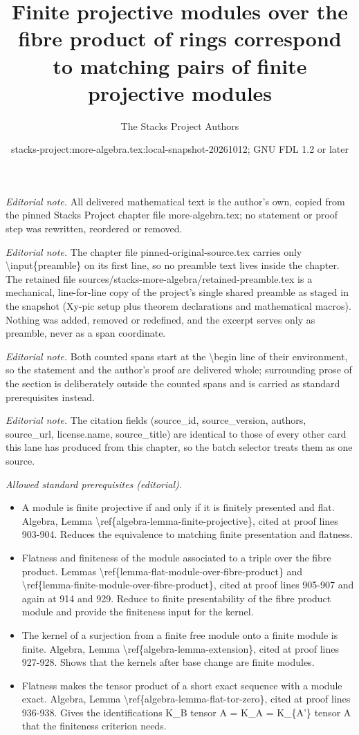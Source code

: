\documentclass[10pt,a4paper]{amsart}
\title{Finite projective modules over the fibre product of rings correspond to matching pairs of finite projective modules}
\author{The Stacks Project Authors}
\date{stacks-project:more-algebra.tex:local-snapshot-20261012; GNU FDL 1.2 or later}
\theoremstyle{plain}
\theoremstyle{definition}
\theoremstyle{remark}
\numberwithin{equation}{subsection}
\begin{document}
\maketitle
\setcounter{subsection}{1}
\noindent\textit{Editorial note.} All delivered mathematical text is the author's own, copied from the pinned Stacks Project chapter file more-algebra.tex; no statement or proof step was rewritten, reordered or removed.\par\medskip
\noindent\textit{Editorial note.} The chapter file pinned-original-source.tex carries only \textbackslash{}input\{preamble\} on its first line, so no preamble text lives inside the chapter. The retained file sources/stacks-more-algebra/retained-preamble.tex is a mechanical, line-for-line copy of the project's single shared preamble as staged in the snapshot (Xy-pic setup plus theorem declarations and mathematical macros). Nothing was added, removed or redefined, and the excerpt serves only as preamble, never as a span coordinate.\par\medskip
\noindent\textit{Editorial note.} Both counted spans start at the \textbackslash{}begin line of their environment, so the statement and the author's proof are delivered whole; surrounding prose of the section is deliberately outside the counted spans and is carried as standard prerequisites instead.\par\medskip
\noindent\textit{Editorial note.} The citation fields (source\_id, source\_version, authors, source\_url, license.name, source\_title) are identical to those of every other card this lane has produced from this chapter, so the batch selector treats them as one source.\par\medskip
\noindent\textit{Allowed standard prerequisites (editorial).}\begin{itemize}
\item A module is finite projective if and only if it is finitely presented and flat. Algebra, Lemma \textbackslash{}ref\{algebra-lemma-finite-projective\}, cited at proof lines 903-904. Reduces the equivalence to matching finite presentation and flatness.
\item Flatness and finiteness of the module associated to a triple over the fibre product. Lemmas \textbackslash{}ref\{lemma-flat-module-over-fibre-product\} and \textbackslash{}ref\{lemma-finite-module-over-fibre-product\}, cited at proof lines 905-907 and again at 914 and 929. Reduce to finite presentability of the fibre product module and provide the finiteness input for the kernel.
\item The kernel of a surjection from a finite free module onto a finite module is finite. Algebra, Lemma \textbackslash{}ref\{algebra-lemma-extension\}, cited at proof lines 927-928. Shows that the kernels after base change are finite modules.
\item Flatness makes the tensor product of a short exact sequence with a module exact. Algebra, Lemma \textbackslash{}ref\{algebra-lemma-flat-tor-zero\}, cited at proof lines 936-938. Gives the identifications K\_B tensor A = K\_A = K\_\{A'\} tensor A that the finiteness criterion needs.
\end{itemize}\medskip
\end{document}
